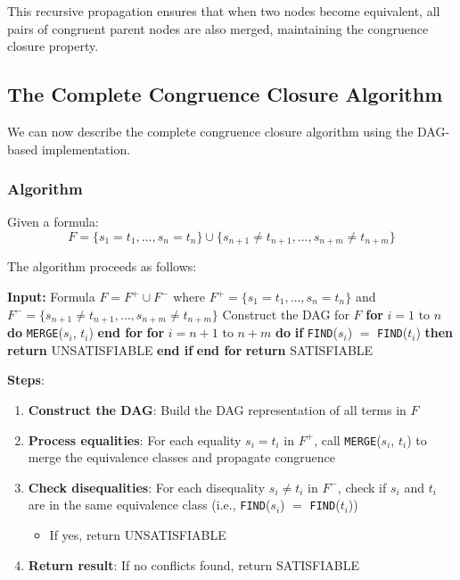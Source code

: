 \documentclass[11pt,a4paper]{article}
\theoremstyle{definition}
\theoremstyle{plain}
\theoremstyle{remark}
\begin{document}
This recursive propagation ensures that when two nodes become equivalent, all pairs of congruent parent nodes are also merged, maintaining the congruence closure property.

\subsection{The Complete Congruence Closure Algorithm}

We can now describe the complete congruence closure algorithm using the DAG-based implementation.

\subsubsection{Algorithm}

\begin{tcolorbox}[colback=orange!10!white,colframe=orange!75!black,title=\textbf{Complete Congruence Closure Algorithm (DAG-based)}]
Given a formula:
\[
F = \{s_1 = t_1, \dots, s_n = t_n\} \cup \{s_{n+1} \neq t_{n+1}, \dots, s_{n+m} \neq t_{n+m}\}
\]

The algorithm proceeds as follows:

\begin{algorithm}[H]
\caption{Congruence Closure Algorithm (DAG-based)}
\begin{algorithmic}[1]
\STATE \textbf{Input:} Formula $F = F^+ \cup F^-$ where $F^+ = \{s_1 = t_1, \dots, s_n = t_n\}$ and $F^- = \{s_{n+1} \neq t_{n+1}, \dots, s_{n+m} \neq t_{n+m}\}$
\STATE Construct the DAG for $F$
\STATE \textbf{for} $i = 1$ to $n$ \textbf{do}
\STATE \quad \texttt{MERGE}($s_i$, $t_i$)
\STATE \textbf{end for}
\STATE \textbf{for} $i = n+1$ to $n+m$ \textbf{do}
\STATE \quad \textbf{if} \texttt{FIND}($s_i$) $=$ \texttt{FIND}($t_i$) \textbf{then}
\STATE \quad \quad \textbf{return} UNSATISFIABLE
\STATE \quad \textbf{end if}
\STATE \textbf{end for}
\STATE \textbf{return} SATISFIABLE
\end{algorithmic}
\end{algorithm}
\end{tcolorbox}

\textbf{Steps}:
\begin{enumerate}
    \item \textbf{Construct the DAG}: Build the DAG representation of all terms in $F$
    \item \textbf{Process equalities}: For each equality $s_i = t_i$ in $F^+$, call \texttt{MERGE}($s_i$, $t_i$) to merge the equivalence classes and propagate congruence
    \item \textbf{Check disequalities}: For each disequality $s_i \neq t_i$ in $F^-$, check if $s_i$ and $t_i$ are in the same equivalence class (i.e., \texttt{FIND}($s_i$) $=$ \texttt{FIND}($t_i$))
    \begin{itemize}
        \item If yes, return UNSATISFIABLE
    \end{itemize}
    \item \textbf{Return result}: If no conflicts found, return SATISFIABLE
\end{enumerate}
\end{document}

